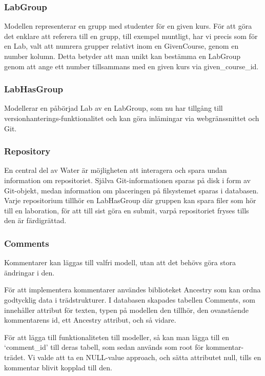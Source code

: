 \subsubsection{LabGroup}
Modellen representerar en grupp med studenter för en given kurs. För att göra det enklare att referera till en grupp, till exempel muntligt, har vi precis som för en Lab, valt att numrera grupper relativt inom en GivenCourse, genom en number kolumn. Detta betyder att man unikt kan bestämma en LabGroup genom att ange ett number tillsammans med en given kurs via given\_course\_id.

\subsubsection{LabHasGroup}\label{sec:modell-labhasgroup}
Modellerar en påbörjad Lab av en LabGroup, som nu har tillgång till versionhanterings-funktionalitet och kan göra inlämingar via webgränssnittet och Git.

\subsubsection{Repository}
En central del av Water är möjligheten att interagera och spara undan information om repositoriet. Själva Git-informationen sparas på disk i form av Git-objekt, medan information om placeringen på filsystemet sparas i databasen. Varje repositorium tillhör en LabHasGroup där gruppen kan spara filer som hör till en laboration, för att till sist göra en submit, varpå repositoriet fryses tills den är färdigrättad.

\subsubsection{Comments}
Kommentarer kan läggas till valfri modell, utan att det behövs göra stora ändringar i den. 

För att implementera kommentarer användes biblioteket Ancestry som kan ordna godtycklig data i trädstrukturer. I databasen skapades tabellen Comments, som innehåller attribut för texten, typen på modellen den tillhör, den ovanstående kommentarens id, ett Ancestry attribut, och så vidare. 

För att lägga till funktionaliteten till modeller, så kan man lägga till en ‘comment\_id’ till deras tabell, som sedan används som root för kommentar-trädet. Vi valde att ta en NULL-value approach, och sätta attributet null, tills en kommentar blivit kopplad till den.
    
